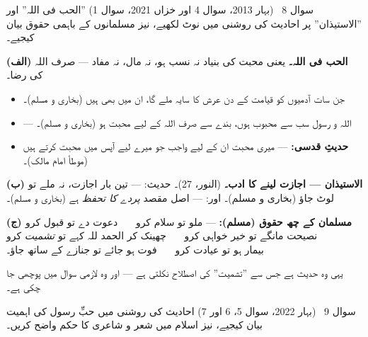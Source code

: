 \begin{sawal}{سوال \textenglish{8} \ \textnormal{\small(بہار \textenglish{2013}، سوال \textenglish{4} اور خزاں \textenglish{2021}، سوال \textenglish{1})}}
''الحب فی اللہ'' اور ''الاستیذان'' پر احادیث کی روشنی میں نوٹ لکھیے، نیز
مسلمانوں کے باہمی حقوق بیان کیجیے۔
\end{sawal}

\begin{hal}
\textbf{(الف) الحب فی اللہ۔} یعنی محبت کی بنیاد نہ نسب ہو، نہ مال، نہ مفاد ---
صرف اللہ کی رضا۔

\begin{itemize}\setlength{\itemsep}{2pt}
  \item جن سات آدمیوں کو قیامت کے دن عرش کا سایہ ملے گا، ان میں
         بھی ہیں (بخاری و مسلم)۔
  \item {} --- اللہ و
        رسول \saw سب سے محبوب ہوں، بندے سے صرف اللہ کے لیے محبت ہو (بخاری و
        مسلم)۔
  \item \textbf{حدیثِ قدسی:} 
        --- میری محبت ان کے لیے واجب جو میرے لیے آپس میں محبت کرتے ہیں (موطأ
        امام مالک)۔
\end{itemize}

\medskip
\textbf{(ب) الاستیذان --- اجازت لینے کا ادب۔} 
(النور، \textenglish{27})۔ حدیث:  --- تین بار اجازت، نہ ملے تو لوٹ جاؤ (بخاری و مسلم)۔
اور:  --- اصل مقصد
\emph{پردے کا تحفظ} ہے (بخاری و مسلم)۔

\medskip
\textbf{(ج) مسلمان کے چھ حقوق (مسلم):} 
--- ملو تو سلام کرو \ \textbullet\ \ دعوت دے تو قبول کرو \ \textbullet\ \
نصیحت مانگے تو خیر خواہی کرو \ \textbullet\ \ چھینک کر الحمد للہ کہے تو
\emph{تشمیت} کرو \ \textbullet\ \ بیمار ہو تو عیادت کرو \ \textbullet\ \ فوت ہو
جائے تو جنازے کے ساتھ جاؤ۔

\smallskip
یہی وہ حدیث ہے جس سے ''تشمیت'' کی اصطلاح نکلتی ہے --- اور وہ لازمی سوال میں پوچھی
جا چکی ہے۔
\end{hal}

\begin{sawal}{سوال \textenglish{9} \ \textnormal{\small(بہار \textenglish{2022}، سوال \textenglish{5}، \textenglish{6} اور \textenglish{7})}}
احادیث کی روشنی میں حبِّ رسول \saw کی اہمیت بیان کیجیے، نیز اسلام میں شعر و شاعری
کا حکم واضح کریں۔
\end{sawal}


